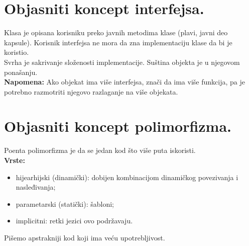 \documentclass[a4paper]{article}
\begin{document}
\section{Objasniti koncept interfejsa.}
  Klasa je opisana korisniku preko javnih metodima klase (plavi, javni deo kapsule). Korisnik 
  interfejsa ne mora da zna implementaciju klase da bi je koristio. \\
  Svrha je sakrivanje složenosti implementacije. Suština objekta je u njegovom ponašanju.\\
  \textbf{Napomena:} Ako objekat ima više interfejsa, znači da ima više funkcija, pa je potrebno
  razmotriti njegovo razlaganje na više objekata.

\section{Objasniti koncept polimorfizma.}
  \noindent Poenta polimorfizma je da se jedan kod što više puta iskoristi. \\
  \textbf{Vrste:}
  \begin{itemize}
    \item hijearhijski (dinamički): dobijen kombinacijom dinamičkog povezivanja i nasleđivanja;
    \item parametarski (statički): šabloni;
    \item implicitni: retki jezici ovo podržavaju.
  \end{itemize}
  Pišemo apstrakniji kod koji ima veću upotrebljivost. \cite{catonmat_polymorphism}
\end{document}
